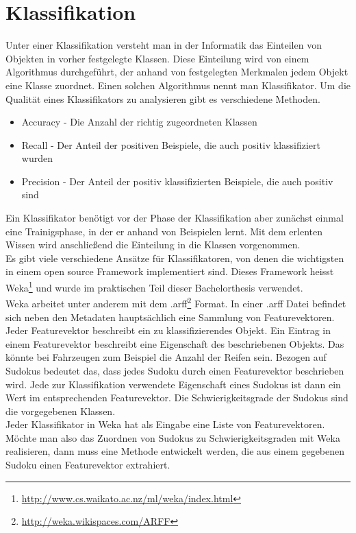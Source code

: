 \documentclass[accentcolor=tud6b,11pt,paper=a4]{tudreport}
\begin{document}
\chapter{Klassifikation}
Unter einer Klassifikation versteht man in der Informatik das Einteilen von Objekten in vorher festgelegte Klassen. Diese Einteilung wird von einem Algorithmus durchgeführt, der anhand von festgelegten Merkmalen jedem Objekt eine Klasse zuordnet. Einen solchen Algorithmus nennt man Klassifikator. Um die Qualität eines Klassifikators zu analysieren gibt es verschiedene Methoden.
\begin{itemize}
\item Accuracy - Die Anzahl der richtig zugeordneten Klassen
\item Recall - Der Anteil der positiven Beispiele, die auch positiv klassifiziert wurden
\item Precision - Der Anteil der positiv klassifizierten Beispiele, die auch positiv sind
\end{itemize}
Ein Klassifikator benötigt vor der Phase der Klassifikation aber zunächst einmal eine Trainigsphase, in der er anhand von Beispielen lernt. Mit dem erlenten Wissen wird anschließend die Einteilung in die Klassen vorgenommen.\\
Es gibt viele verschiedene Ansätze für Klassifikatoren, von denen die wichtigsten in einem open source Framework implementiert sind. Dieses Framework heisst Weka\footnote{\url{http://www.cs.waikato.ac.nz/ml/weka/index.html}} und wurde im praktischen Teil dieser Bachelorthesis verwendet.\\
Weka arbeitet unter anderem mit dem .arff\footnote{\url{http://weka.wikispaces.com/ARFF}} Format. In einer .arff Datei befindet sich neben den Metadaten hauptsächlich eine Sammlung von Featurevektoren. Jeder Featurevektor beschreibt ein zu klassifizierendes Objekt. Ein Eintrag in einem Featurevektor beschreibt eine Eigenschaft des beschriebenen Objekts. Das könnte bei Fahrzeugen zum Beispiel die Anzahl der Reifen sein. Bezogen auf Sudokus bedeutet das, dass jedes Sudoku durch einen Featurevektor beschrieben wird. Jede zur Klassifikation verwendete Eigenschaft eines Sudokus ist dann ein Wert im entsprechenden Featurevektor. Die Schwierigkeitsgrade der Sudokus sind die vorgegebenen Klassen.\\
Jeder Klassifikator in Weka hat als Eingabe eine Liste von Featurevektoren. Möchte man also das Zuordnen von Sudokus zu Schwierigkeitsgraden mit Weka realisieren, dann muss eine Methode entwickelt werden, die aus einem gegebenen Sudoku einen Featurevektor extrahiert.\\
\end{document}

